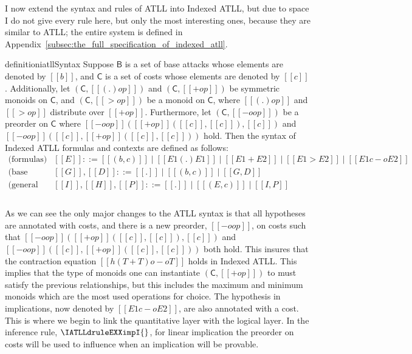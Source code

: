 I now extend the syntax and rules of ATLL into Indexed ATLL, but due
to space I do not give every rule here, but only the most interesting
ones, because they are similar to ATLL; the entire system is defined
in Appendix~\ref{subsec:the_full_specification_of_indexed_atll}.
\begin{restatable}[]{definition}{iatllSyntax}
  \label{def:ATLL-syntax}
  Suppose $\mathsf{B}$ is a set of base attacks whose elements are
  denoted by $[[b]]$, and $\mathsf{C}$ is a set of costs whose
  elements are denoted by $[[c]]$.  Additionally, let
  $(\mathsf{C},[[(.)op]])$ and $(\mathsf{C},[[+op]])$ be symmetric
  monoids on $\mathsf{C}$, and $(\mathsf{C},[[>op]])$ be a monoid on
  $\mathsf{C}$, where $[[(.)op]]$ and $[[>op]]$ distribute over
  $[[+op]]$.  Furthermore, let $(\mathsf{C}, [[-oop]])$ be a preorder
  on $\mathsf{C}$ where $[[-oop]]([[+op]]([[c]],[[c]]),[[c]])$ and $[[-oop]]([[c]],[[+op]]([[c]],[[c]]))$ hold.  Then
  the syntax of Indexed ATLL formulas and contexts are defined as
  follows:
  \[
  \begin{array}{cll}
    \text{(formulas)}         & [[E]] ::= [[(b, c)]] \mid [[E1 (.) E1]] \mid [[E1 + E2]] \mid [[E1 > E2]] \mid [[E1 c -o E2]]\\
    \text{(base contexts)}    & [[G]],[[D]] ::= [[.]] \mid [[(b,c)]] \mid [[G,D]]\\
    \text{(general contexts)} & [[I]],[[H]],[[P]] ::= [[.]] \mid [[(E,c)]] \mid [[I,P]]\\\\
  \end{array}
  \]
\end{restatable}
\vspace{-10px} As we can see the only major changes to the ATLL syntax
is that all hypotheses are annotated with costs, and there is a new
preorder, $[[-oop]]$, on costs such that
$[[-oop]]([[+op]]([[c]],[[c]]),[[c]])$ and
$[[-oop]]([[c]],[[+op]]([[c]],[[c]]))$ both hold.  This insures that
the contraction equation $[[h(T + T) o-o T]]$ holds in Indexed ATLL.
This implies that the type of monoids one can instantiate
$(\mathsf{C},[[+op]])$ to must satisfy the previous relationships, but
this includes the maximum and minimum monoids which are the most used
operations for choice. The hypothesis in implications, now denoted by
$[[E1 c -o E2]]$, are also annotated with a cost.  This is where we
begin to link the quantitative layer with the logical layer.  In the
inference rule, $\IATLLdruleEXXimpI{}$, for linear implication the
preorder on costs will be used to influence when an implication will
be provable.


